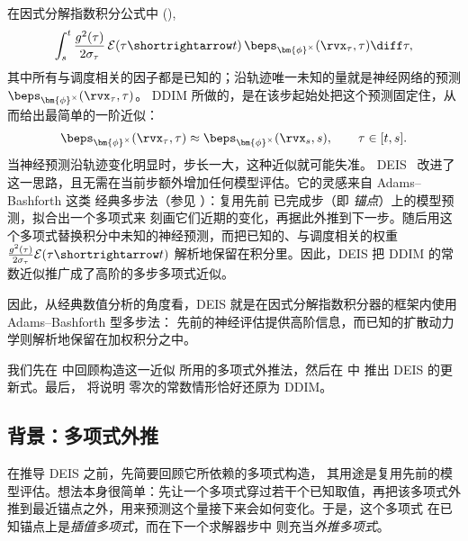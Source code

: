 在因式分解指数积分公式中 (),
\[
\int_s^t
\frac{g^2(\tau)}{2\sigma_\tau}\,
\mathcal E(\tau\shortrightarrow t)\,
\beps_{\bm{\phi}^\times}(\rvx_\tau,\tau)
\diff\tau,
\]
其中所有与调度相关的因子都是已知的；沿轨迹唯一未知的量就是神经网络的预测 $\beps_{\bm{\phi}^\times}(\rvx_\tau,\tau)$。
DDIM 所做的，是在该步起始处把这个预测固定住，从而给出最简单的一阶近似：
\[
\beps_{\bm{\phi}^\times}(\rvx_\tau,\tau)
\approx
\beps_{\bm{\phi}^\times}(\rvx_s,s),
\qquad
\tau\in[t,s].
\]
当神经预测沿轨迹变化明显时，步长一大，这种近似就可能失准。
DEIS~\citep{zhang2022fast} 改进了这一思路，且无需在当前步额外增加任何模型评估。它的灵感来自 Adams--Bashforth 这类
经典多步法（参见 ）：复用先前
已完成步（即 \emph{锚点}）上的模型预测，拟合出一个多项式来
刻画它们近期的变化，再据此外推到下一步。随后用这个多项式替换积分中未知的神经预测，而把已知的、与调度相关的权重
$\tfrac{g^2(\tau)}{2\sigma_\tau}
\mathcal E(\tau\shortrightarrow t)$
解析地保留在积分里。因此，DEIS 把 DDIM 的常数近似推广成了高阶的多步多项式近似。

因此，从经典数值分析的角度看，DEIS 就是在因式分解指数积分器的框架内使用 Adams--Bashforth 型多步法：
先前的神经评估提供高阶信息，而已知的扩散动力学则解析地保留在加权积分之中。

我们先在  中回顾构造这一近似
所用的多项式外推法，然后在  中
推出 DEIS 的更新式。最后， 将说明
零次的常数情形恰好还原为 DDIM。

\subsection{背景：多项式外推}
\label{subsec:poly-extrapolation}

在推导 DEIS 之前，先简要回顾它所依赖的多项式构造，
其用途是复用先前的模型评估。想法本身很简单：先让一个多项式穿过若干个已知取值，再把该多项式外推到最近锚点之外，用来预测这个量接下来会如何变化。于是，这个多项式
在已知锚点上是\emph{插值多项式}，而在下一个求解器步中
则充当\emph{外推多项式}。

